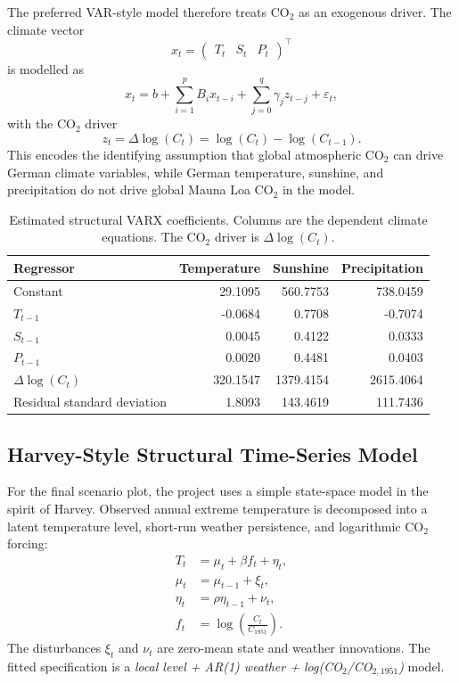 \documentclass[11pt,a4paper]{article}
\begin{document}
The preferred VAR-style model therefore treats CO$_2$ as an exogenous driver.
The climate vector
\[
  x_t =
  \begin{pmatrix}
    T_t & S_t & P_t
  \end{pmatrix}^{\top}
\]
is modelled as
\begin{equation}
  x_t
  =
  b
  +
  \sum_{i=1}^{p} B_i x_{t-i}
  +
  \sum_{j=0}^{q} \gamma_j z_{t-j}
  +
  \varepsilon_t,
\end{equation}
with the CO$_2$ driver
\begin{equation}
  z_t = \Delta \log(C_t)
  =
  \log(C_t)-\log(C_{t-1}).
\end{equation}
This encodes the identifying assumption that global atmospheric CO$_2$ can drive
German climate variables, while German temperature, sunshine, and precipitation
do not drive global Mauna Loa CO$_2$ in the model.

\begin{table}[htbp]
  \centering
  \caption{Estimated structural VARX coefficients. Columns are the dependent
  climate equations. The CO$_2$ driver is $\Delta\log(C_t)$.}
  \label{tab:varx-coefficients}
  \begin{tabular}{lrrr}
    \toprule
    Regressor & Temperature & Sunshine & Precipitation \\
    \midrule
    Constant & 29.1095 & 560.7753 & 738.0459 \\
    $T_{t-1}$ & -0.0684 & 0.7708 & -0.7074 \\
    $S_{t-1}$ & 0.0045 & 0.4122 & 0.0333 \\
    $P_{t-1}$ & 0.0020 & 0.4481 & 0.0403 \\
    $\Delta\log(C_t)$ & 320.1547 & 1379.4154 & 2615.4064 \\
    \midrule
    Residual standard deviation & 1.8093 & 143.4619 & 111.7436 \\
    \bottomrule
  \end{tabular}
\end{table}

\subsection{Harvey-Style Structural Time-Series Model}

For the final scenario plot, the project uses a simple state-space model in the
spirit of Harvey. Observed annual extreme temperature is decomposed into a
latent temperature level, short-run weather persistence, and logarithmic
CO$_2$ forcing:
\begin{align}
  T_t &= \mu_t + \beta f_t + \eta_t, \\
  \mu_t &= \mu_{t-1} + \xi_t, \\
  \eta_t &= \rho \eta_{t-1} + \nu_t, \\
  f_t &= \log\left(\frac{C_t}{C_{1951}}\right).
\end{align}
The disturbances $\xi_t$ and $\nu_t$ are zero-mean state and weather
innovations. The fitted specification is a
\emph{local level + AR(1) weather + log(CO$_2$/CO$_{2,1951}$)} model.
\end{document}

